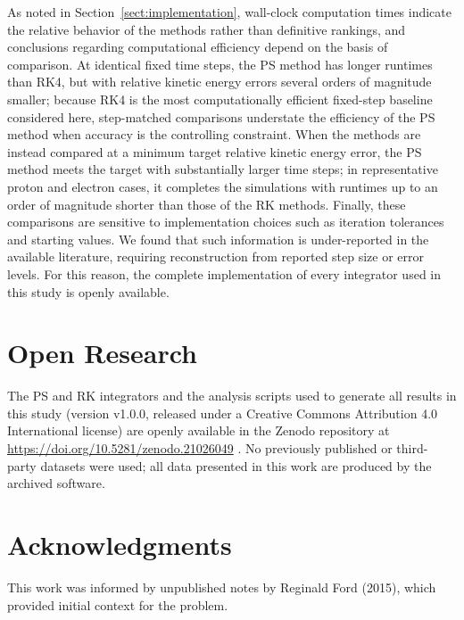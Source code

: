 \documentclass{article}
\begin{document}
As noted in Section~\ref{sect:implementation}, wall-clock computation times indicate the relative behavior of the methods rather than definitive rankings, and conclusions regarding computational efficiency depend on the basis of comparison. At identical fixed time steps, the PS method has longer runtimes than RK4, but with relative kinetic energy errors several orders of magnitude smaller; because RK4 is the most computationally efficient fixed-step baseline considered here, step-matched comparisons understate the efficiency of the PS method when accuracy is the controlling constraint. When the methods are instead compared at a minimum target relative kinetic energy error, the PS method meets the target with substantially larger time steps; in representative proton and electron cases, it completes the simulations with runtimes up to an order of magnitude shorter than those of the RK methods. Finally, these comparisons are sensitive to implementation choices such as iteration tolerances and starting values. We found that such information is under-reported in the available literature, requiring reconstruction from reported step size or error levels. For this reason, the complete implementation of every integrator used in this study is openly available.

\section*{Open Research}
The PS and RK integrators and the analysis scripts used to generate all results in this study (version v1.0.0, released under a Creative Commons Attribution 4.0 International license) are openly available in the Zenodo repository at \url{https://doi.org/10.5281/zenodo.21026049} \cite{Jiles_PS_code}. No previously published or third-party datasets were used; all data presented in this work are produced by the archived software.

\section*{Acknowledgments}
This work was informed by unpublished notes by Reginald Ford (2015), which provided initial context for the problem.

\pagebreak
\printbibliography

\pagebreak
\appendix

\setcounter{equation}{0} 
\renewcommand{\theequation}{\thesection.\arabic{equation}} 
\end{document}

